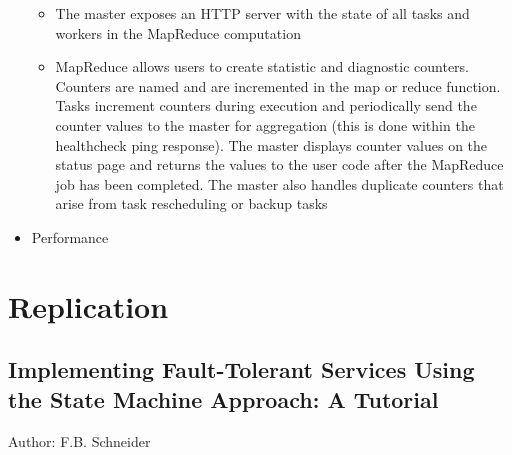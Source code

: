 \documentclass[a4paper]{article}
\begin{document}
\begin{itemize}
\begin{itemize}
\item The master exposes an HTTP server with the state of all tasks and workers in the MapReduce computation

\item MapReduce allows users to create statistic and diagnostic counters. Counters are named and are incremented in the map or reduce function. Tasks increment counters during execution and periodically send the counter values to the master for aggregation (this is done within the healthcheck ping response). The master displays counter values on the status page and returns the values to the user code after the MapReduce job has been completed. The master also handles duplicate counters that arise from task rescheduling or backup tasks 

\end{itemize}

\item Performance


\end{itemize}



\section{Replication}

\subsection{Implementing Fault-Tolerant Services Using the State Machine Approach: A Tutorial}

Author: F.B. Schneider
\end{document}
